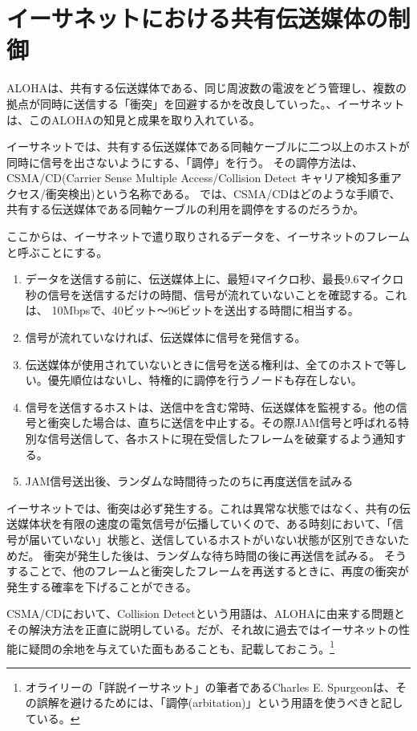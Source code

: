 \section{イーサネットにおける共有伝送媒体の制御}

ALOHAは、共有する伝送媒体である、同じ周波数の電波をどう管理し、複数の拠点が同時に送信する「衝突」を回避するかを改良していった。、イーサネットは、このALOHAの知見と成果を取り入れている。

イーサネットでは、共有する伝送媒体である同軸ケーブルに二つ以上のホストが同時に信号を出さないようにする、「調停」を行う。
その調停方法は、CSMA/CD(Carrier Sense Multiple Access/Collision Detect キャリア検知多重アクセス/衝突検出)という名称である。
では、CSMA/CDはどのような手順で、共有する伝送媒体である同軸ケーブルの利用を調停をするのだろうか。

ここからは、イーサネットで遣り取りされるデータを、イーサネットのフレームと呼ぶことにする。

\begin{enumerate}
	\item データを送信する前に、伝送媒体上に、最短4マイクロ秒、最長9.6マイクロ秒の信号を送信するだけの時間、信号が流れていないことを確認する。これは、 10Mbpsで、40ビット～96ビットを送出する時間に相当する。
	\item 信号が流れていなければ、伝送媒体に信号を発信する。
	\item 伝送媒体が使用されていないときに信号を送る権利は、全てのホストで等しい。優先順位はないし、特権的に調停を行うノードも存在しない。  
	\item 信号を送信するホストは、送信中を含む常時、伝送媒体を監視する。他の信号と衝突した場合は、直ちに送信を中止する。その際JAM信号と呼ばれる特別な信号送信して、各ホストに現在受信したフレームを破棄するよう通知する。
	\item JAM信号送出後、ランダムな時間待ったのちに再度送信を試みる
\end{enumerate}

イーサネットでは、衝突は必ず発生する。これは異常な状態ではなく、共有の伝送媒体状を有限の速度の電気信号が伝播していくので、ある時刻において、「信号が届いていない」状態と、送信しているホストがいない状態が区別できないためだ。
衝突が発生した後は、ランダムな待ち時間の後に再送信を試みる。
そうすることで、他のフレームと衝突したフレームを再送するときに、再度の衝突が発生する確率を下げることができる。

CSMA/CDにおいて、Collision Detectという用語は、ALOHAに由来する問題とその解決方法を正直に説明している。だが、それ故に過去ではイーサネットの性能に疑問の余地を与えていた面もあることも、記載しておこう。\footnote{オライリーの「詳説イーサネット」の筆者であるCharles E. Spurgeonは、その誤解を避けるためには、「調停(arbitation)」という用語を使うべきと記している。}



